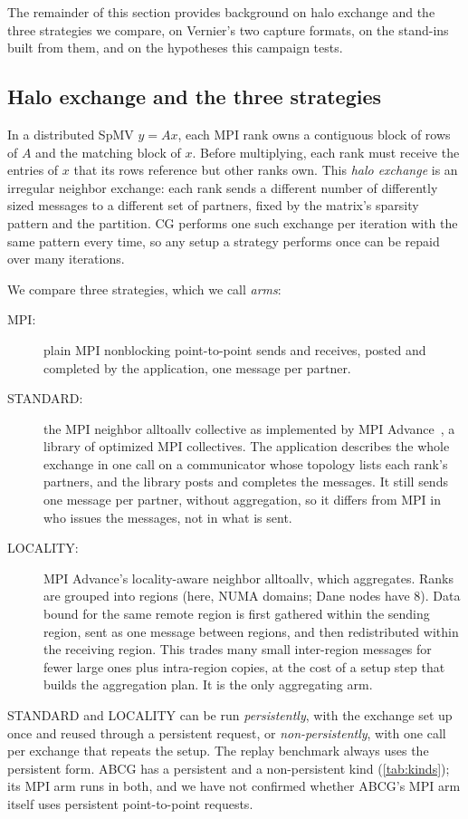 \documentclass[11pt]{article}
\begin{document}
The remainder of this section provides background on halo exchange and the three
strategies we compare, on Vernier's two capture formats, on the stand-ins built from them,
and on the hypotheses this campaign tests.

\subsection{Halo exchange and the three strategies}

In a distributed SpMV $y = Ax$, each MPI rank owns a contiguous block of rows of $A$ and
the matching block of $x$. Before multiplying, each rank must receive the entries of $x$
that its rows reference but other ranks own. This \emph{halo exchange} is an irregular
neighbor exchange: each rank sends a different number of differently sized messages to a
different set of partners, fixed by the matrix's sparsity pattern and the partition. CG
performs one such exchange per iteration with the same pattern every time, so any setup a
strategy performs once can be repaid over many iterations.

We compare three strategies, which we call \emph{arms}:
\begin{description}
\item[MPI:] plain MPI nonblocking point-to-point sends and receives, posted and completed
by the application, one message per partner.
\item[STANDARD:] the MPI neighbor alltoallv collective as implemented by MPI
Advance~\cite{mpiadvance2023}, a library of optimized MPI collectives. The application
describes the whole exchange in one call on a communicator whose topology lists each
rank's partners, and the library posts and completes the messages. It still sends one
message per partner, without aggregation, so it differs from MPI in who issues the
messages, not in what is sent.
\item[LOCALITY:] MPI Advance's locality-aware neighbor alltoallv, which aggregates. Ranks
are grouped into regions (here, NUMA domains; Dane nodes have 8). Data bound for the same
remote region is first gathered within the sending region, sent as one message between
regions, and then redistributed within the receiving region. This trades many small
inter-region messages for fewer large ones plus intra-region copies, at the cost of a
setup step that builds the aggregation plan. It is the only aggregating arm.
\end{description}
STANDARD and LOCALITY can be run \emph{persistently}, with the exchange set up once and
reused through a persistent request, or \emph{non-persistently}, with one call per
exchange that repeats the setup. The replay benchmark always uses the persistent form.
ABCG has a persistent and a non-persistent kind (\cref{tab:kinds}); its MPI arm runs in
both, and we have not confirmed whether ABCG's MPI arm itself uses persistent
point-to-point requests.
\end{document}
